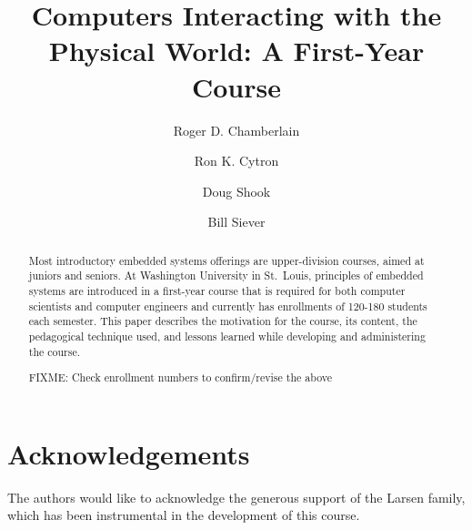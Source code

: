 \documentclass[runningheads]{llncs}
\newcommand{\FIXME}[1]{{FIXME: #1}}
\begin{document}
%
\title{Computers Interacting with the Physical World: A First-Year Course}
%
%
\author{Roger D. Chamberlain%
\and
Ron K. Cytron%
\and
Doug Shook%
\and
Bill Siever%
}
%
%
%

\maketitle              %
%
\begin{abstract}
Most introductory embedded systems offerings are upper-division courses,
aimed at juniors and seniors.  At Washington University in St.~Louis,
principles of embedded systems are introduced in a first-year course that
is required for both computer scientists and computer engineers and
currently has enrollments of 120-180 students each semester.
This paper describes the motivation for the course, its content,
the pedagogical technique used, and lessons learned while developing
and administering the course.

\FIXME{Check enrollment numbers to confirm/revise the above}

\end{abstract}
%
%
%








\section*{Acknowledgements}
The authors would like to acknowledge
the generous support of the Larsen family, which has been instrumental
in the development of this course.


%
%
%


%
\end{document}
